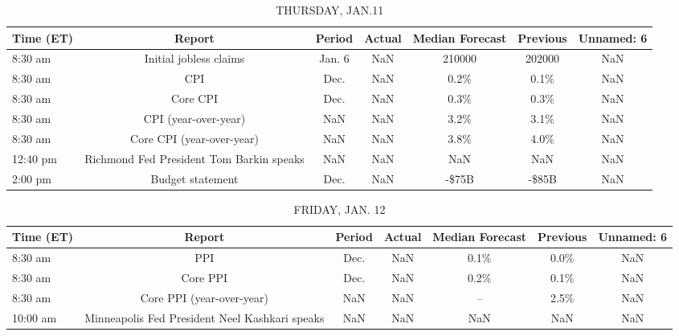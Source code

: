 \documentclass{article}%
\begin{document}
%


\begin{table}[htbp]%
\caption{THURSDAY, JAN.11}%
\centering%
\begin{adjustbox}{width=1\textwidth}%
\begin{tabular}{lcccccc}
\toprule
Time (ET) &                                   Report & Period & Actual & Median Forecast & Previous & Unnamed: 6 \\
\midrule
  8:30 am &                   Initial jobless claims & Jan. 6 &    NaN &          210000 &   202000 &        NaN \\
  8:30 am &                                      CPI &   Dec. &    NaN &            0.2\% &     0.1\% &        NaN \\
  8:30 am &                                 Core CPI &   Dec. &    NaN &            0.3\% &     0.3\% &        NaN \\
  8:30 am &                     CPI (year-over-year) &    NaN &    NaN &            3.2\% &     3.1\% &        NaN \\
  8:30 am &                Core CPI (year-over-year) &    NaN &    NaN &            3.8\% &     4.0\% &        NaN \\
 12:40 pm & Richmond Fed President Tom Barkin speaks &    NaN &    NaN &             NaN &      NaN &        NaN \\
  2:00 pm &                         Budget statement &   Dec. &    NaN &           -\$75B &    -\$85B &        NaN \\
\bottomrule
\end{tabular}
%
\end{adjustbox}%
\end{table}

%


\begin{table}[htbp]%
\caption{FRIDAY, JAN. 12}%
\centering%
\begin{adjustbox}{width=1\textwidth}%
\begin{tabular}{lcccccc}
\toprule
Time (ET) &                                         Report & Period & Actual & Median Forecast & Previous & Unnamed: 6 \\
\midrule
  8:30 am &                                            PPI &   Dec. &    NaN &            0.1\% &     0.0\% &        NaN \\
  8:30 am &                                       Core PPI &   Dec. &    NaN &            0.2\% &     0.1\% &        NaN \\
  8:30 am &                      Core PPI (year-over-year) &    NaN &    NaN &              -- &     2.5\% &        NaN \\
 10:00 am & Minneapolis Fed President Neel Kashkari speaks &    NaN &    NaN &             NaN &      NaN &        NaN \\
\bottomrule
\end{tabular}
%
\end{adjustbox}%
\end{table}
\end{document}
